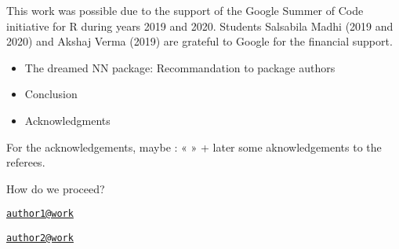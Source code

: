 This work was possible due to the support of the Google Summer of Code
initiative for R during years 2019 and 2020. Students Salsabila Madhi
(2019 and 2020) and Akshaj Verma (2019) are grateful to Google for the
financial support.



\begin{itemize}
\tightlist
\item
  The dreamed NN package: Recommandation to package authors
\item
  Conclusion
\item
  Acknowledgments
\end{itemize}

For the acknowledgements, maybe : « » + later some aknowledgements to
the referees.

How do we proceed?


\address{%
Salsabila Mahdi\\
Affiliation\\
line 1\\ line 2\\
}
\href{mailto:author1@work}{\nolinkurl{author1@work}}

\address{%
Patrice Kiener\\
Affiliation\\
line 1\\ line 2\\
}
\href{mailto:author2@work}{\nolinkurl{author2@work}}

